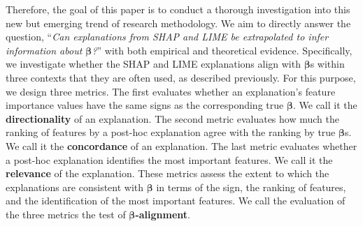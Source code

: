 \documentclass[mnsc,blindrev]{informs3}
\begin{document}
Therefore, the goal of this paper is to conduct a thorough investigation into this new but emerging trend of research methodology. We aim to directly answer the question, ``\emph{Can explanations from SHAP and LIME be extrapolated to infer information about $\boldsymbol{\beta}$?}'' with both empirical and theoretical evidence. Specifically, we investigate whether the SHAP and LIME explanations align with $\boldsymbol{\beta}$s within three contexts that they are often used, as described previously. For this purpose, we design three metrics. The first evaluates whether an explanation's feature importance values have the same signs as the corresponding true $\boldsymbol{\beta}$. We call it the \textbf{directionality} of an explanation. The second metric evaluates how much the ranking of features by a post-hoc explanation agree with the ranking by true $\boldsymbol{\beta}$s. We call it the \textbf{concordance} of an explanation. The last metric evaluates whether a post-hoc explanation identifies the most important features. We call it the \textbf{relevance} of the explanation. These metrics assess the extent to which the explanations are consistent with $\boldsymbol{\beta}$ in terms of the sign, the ranking of features, and the identification of the most important features. We call the evaluation of the three metrics the test of \textbf{$\boldsymbol{\beta}$-alignment}.
\end{document}
